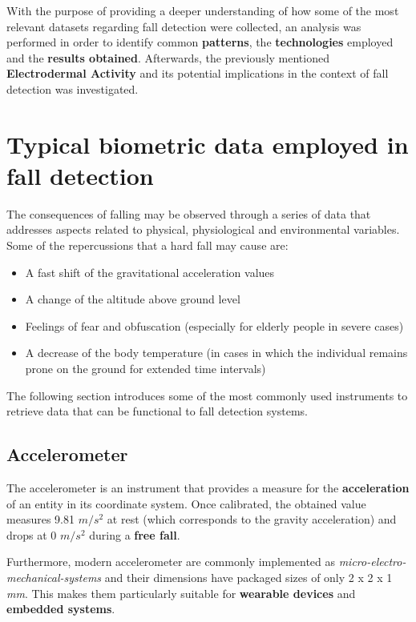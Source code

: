 \label{ch:analysis}

With the purpose of providing a deeper understanding of how some of the most relevant datasets regarding fall detection were collected, an analysis was performed in order to identify common \textbf{patterns}, the \textbf{technologies} employed and the \textbf{results obtained}. Afterwards, the previously mentioned \textbf{Electrodermal Activity} and its potential implications in the context of fall detection was investigated.

\section{Typical biometric data employed in fall detection}\label{sec:hardware}

The consequences of falling may be observed through a series of data that addresses aspects related to physical, physiological and environmental variables. Some of the repercussions that a hard fall may cause are:

\begin{itemize}
    \item A fast shift of the gravitational acceleration values
    \item A change of the altitude above ground level
    \item Feelings of fear and obfuscation (especially for elderly people in severe cases)
    \item A decrease of the body temperature (in cases in which the individual remains prone on the ground for extended time intervals)
\end{itemize}

The following section introduces some of the most commonly used instruments to retrieve data that can be functional to fall detection systems.

\subsection{Accelerometer}\label{subsec:accelerometer}

The accelerometer is an instrument that provides a measure for the \textbf{acceleration} of an entity in its coordinate system. Once calibrated, the obtained value measures 9.81 $m/s^2$ at rest (which corresponds to the gravity acceleration) and drops at 0 $m/s^2$ during a \textbf{free fall}.

Furthermore, modern accelerometer are commonly implemented as \emph{micro-electro-mechanical-systems} and their dimensions have packaged sizes of only 2 x 2 x 1 \textit{mm}. This makes them particularly suitable for \textbf{wearable devices} and \textbf{embedded systems}.

